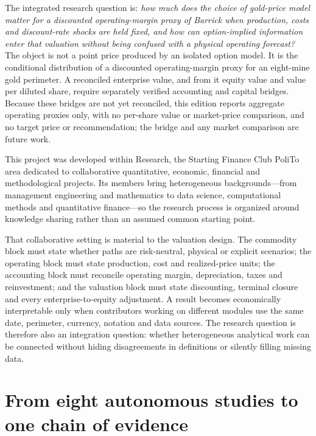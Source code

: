 The integrated research question is: \emph{how much does the choice of
gold-price model matter for a discounted operating-margin proxy of Barrick when
production, costs and discount-rate shocks are held fixed, and how can
option-implied information enter that valuation without being confused with a
physical operating forecast?} The object is not a point price produced by an
isolated option model. It is the conditional distribution of a discounted
operating-margin proxy for an eight-mine gold perimeter. A reconciled
enterprise value, and from it equity value and value per diluted share,
require separately verified accounting and capital bridges. Because these
bridges are not yet reconciled, this edition
reports aggregate operating proxies only, with no per-share value or
market-price comparison, and no target price or recommendation; the bridge and
any market comparison are future work.

This project was developed within Research, the Starting Finance Club PoliTo
area dedicated to collaborative quantitative, economic, financial and
methodological projects. Its members bring heterogeneous backgrounds---from
management engineering and mathematics to data science, computational methods
and quantitative finance---so the research process is organized around
knowledge sharing rather than an assumed common starting point.

That collaborative setting is material to the valuation design. The commodity
block must state whether paths are risk-neutral, physical or explicit
scenarios; the operating block must state production, cost and realized-price
units; the accounting block must reconcile operating margin, depreciation,
taxes and reinvestment; and the valuation block must state discounting,
terminal closure and every enterprise-to-equity adjustment. A result becomes
economically interpretable only when contributors working on different modules
use the same date, perimeter, currency, notation and data sources. The research
question is therefore also an integration question: whether heterogeneous
analytical work can be connected without hiding disagreements in definitions
or silently filling missing data.

\section{From eight autonomous studies to one chain of evidence}

